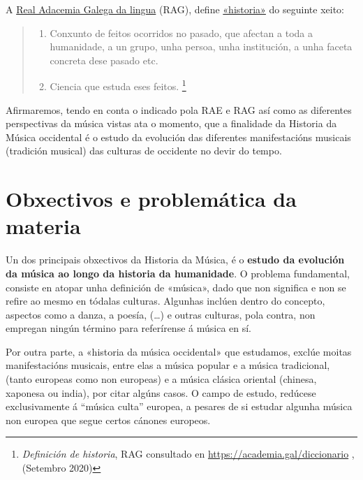 \documentclass[a4paper, twoside]{templates/ociamthesis}
\providecommand{\tightlist}{%
  \setlength{\itemsep}{0pt}\setlength{\parskip}{0pt}}
\begin{document}
A \href{https://academia.gal/dicionario}{Real Adacemia Galega da lingua} (RAG), define \href{https://academia.gal/dicionario/-/termo/busca/Historia}{«historia»} do seguinte xeito:

\begin{quote}
\begin{enumerate}
\def\labelenumi{\arabic{enumi}.}
\tightlist
\item
  Conxunto de feitos ocorridos no pasado, que afectan a toda a humanidade, a un grupo, unha persoa, unha institución, a unha faceta concreta dese pasado etc.\\
\item
  Ciencia que estuda eses feitos. \footnote{\emph{Definición de historia}, RAG consultado en \url{https://academia.gal/diccionario} , (Setembro 2020)}
\end{enumerate}
\end{quote}

Afirmaremos, tendo en conta o indicado pola RAE e RAG así como as diferentes perspectivas da música vistas ata o momento, que a finalidade da Historia da Música occidental é o estudo da evolución das diferentes manifestacións musicais (tradición musical) das culturas de occidente no devir do tempo.

\hypertarget{obxectivos-e-problemuxe1tica-da-materia}{%
\section*{Obxectivos e problemática da materia}\label{obxectivos-e-problemuxe1tica-da-materia}}

Un dos principais obxectivos da Historia da Música, é o \textbf{estudo da evolución da música ao longo da historia da humanidade}. O problema fundamental, consiste en atopar unha definición de «música», dado que non significa e non se refire ao mesmo en tódalas culturas. Algunhas inclúen dentro do concepto, aspectos como a danza, a poesía, (\ldots) e outras culturas, pola contra, non empregan ningún término para referírense á música en sí.

Por outra parte, a «historia da música occidental» que estudamos, exclúe moitas manifestacións musicais, entre elas a música popular e a música tradicional, (tanto europeas como non europeas) e a música clásica oriental (chinesa, xaponesa ou india), por citar algúns casos. O campo de estudo, redúcese exclusivamente á ``música culta'' europea, a pesares de si estudar algunha música non europea que segue certos cánones europeos.
\end{document}
